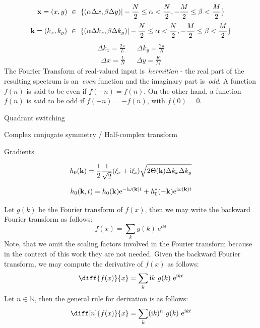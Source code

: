 \begin{equation}
\label{eq:spatial_domain}
 \mathbf{x} = (x,y)~\in~\{(\alpha\Delta x,\beta\Delta y)|
-\frac{N}{2}\leq\alpha<\frac{N}{2},-\frac{M}{2}\leq\beta<\frac{M}{2}\}
\end{equation}
\begin{equation}
\label{eq:wave_vector_domain}
 \mathbf{k} = (k_x,k_y)~\in~\{(\alpha\Delta k_x,\beta\Delta k_y)|
-\frac{N}{2}\leq\alpha<\frac{N}{2},-\frac{M}{2}\leq\beta<\frac{M}{2}\}
\end{equation}
\begin{align}
\label{eq:delta_kx_delta_ky}
 \Delta k_x = \frac{2\pi}{L} && \Delta k_y = \frac{2\pi}{K}
\end{align}
\begin{align}
 \Delta x = \frac{L}{N} && \Delta y = \frac{K}{M}
\end{align}
The Fourier Transform of real-valued input is~\emph{hermitian} - the real part of the resulting spectrum
is an~\emph{even} function and the imaginary part is~\emph{odd}. A function $f(n)$ is said to be even if
$f(-n) = f(n)$. On the other hand, a function $f(n)$ is said to be odd if $f(-n) = -f(n)$,
with $f(0) = 0$.


Quadrant switching

Complex conjugate symmetry / Half-complex transform

Gradients



\begin{equation}
h_0(\mathbf{k}) =
\frac{1}{2}
\frac{1}{\sqrt{2}}(\xi_r+\mathrm{i}\xi_i)
\sqrt{2\Theta(\mathbf{k})\Delta k_x \Delta k_y}
\end{equation}

\begin{equation}
 h_0(\mathbf{k}, t) =
 h_0(\mathbf{k})\mathrm{e}^{-\mathrm{i}\omega(\mathbf{k})t}
 + h_0^\ast(\mathbf{-k})\mathrm{e}^{\mathrm{i}\omega(\mathbf{k})t}
\end{equation}

Let $g(k)$ be the Fourier transform of $f(x)$, then we may write the
backward Fourier transform as follows:
\begin{equation}
 f(x) = \sum_{k}g(k)~\mathrm{e}^{\mathrm{i}kt}
\end{equation}
Note, that we omit the scaling factors involved in the Fourier transform
because in the context of this work they are not needed.
Given the backward Fourier transform, we may compute the derivative of $f(x)$
as follows:
\begin{equation}
  \diff{f(x)}{x} = \sum_{k}\mathrm{i}k~g(k)~\mathrm{e}^{\mathrm{i}kt}
\end{equation}
Let $n \in \mathbb{N}$, then the general rule for derivation is as follows:
\begin{equation}
  \diff[n]{f(x)}{x} = \sum_{k}(\mathrm{i}k)^n~g(k)~\mathrm{e}^{\mathrm{i}kt}
\end{equation}


